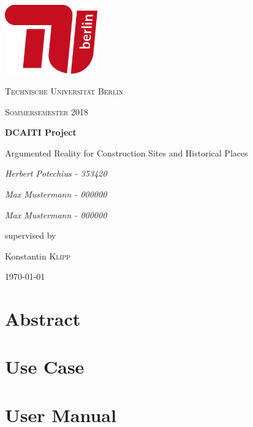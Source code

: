 \documentclass[11pt]{article}
\begin{document}
\begin{titlepage}
	\centering
	\includegraphics[width=0.3\textwidth]{Bilder/tub_logo.png}\par\vspace{1cm}
	{\scshape\LARGE Technische Universität Berlin \par}
	\vspace{1cm}
	{\scshape\Large Sommersemester 2018 \par}
	\vspace{1.5cm}
	{\huge\bfseries DCAITI Project\par}
	\vspace{0.5cm}
	{\Large Argumented Reality for Construction Sites and Historical Places\par}
	\vspace{2cm}
	{\Large\itshape Herbert Potechius - 353420\par}
	{\Large\itshape Max Mustermann - 000000\par}
	{\Large\itshape Max Mustermann - 000000\par}
	\vfill
	supervised by\par
	Konstantin \textsc{Klipp}
	\vfill
	{\large \today\par}
\end{titlepage}

\tableofcontents

\newpage


\section{Abstract}

\section{Use Case}

\section{User Manual}
\end{document}
